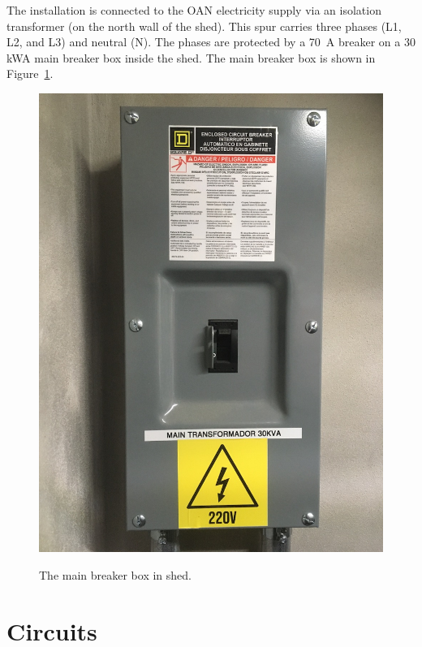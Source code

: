 \ifddotioan
The {\projectname} installation is connected to the OAN electricity supply via an isolation transformer (on the north wall of the shed). This spur carries three phases (L1, L2, and L3) and neutral (N). The phases are protected by a 70~A breaker on a 30 kWA main breaker box inside the shed. The main breaker box is shown in Figure~\ref{figure:main-breaker-box}.

\begin{figure}[t]
\begin{center}
\begin{labeled}{\includegraphics[width=0.45\linewidth,angle=0]{figures/electrical-power-ddoti-main-breaker-box.jpg}}
\end{labeled}
\end{center}
\caption{The main breaker box in shed.}
\label{figure:main-breaker-box}
\end{figure}
\fi

\section{Circuits}

